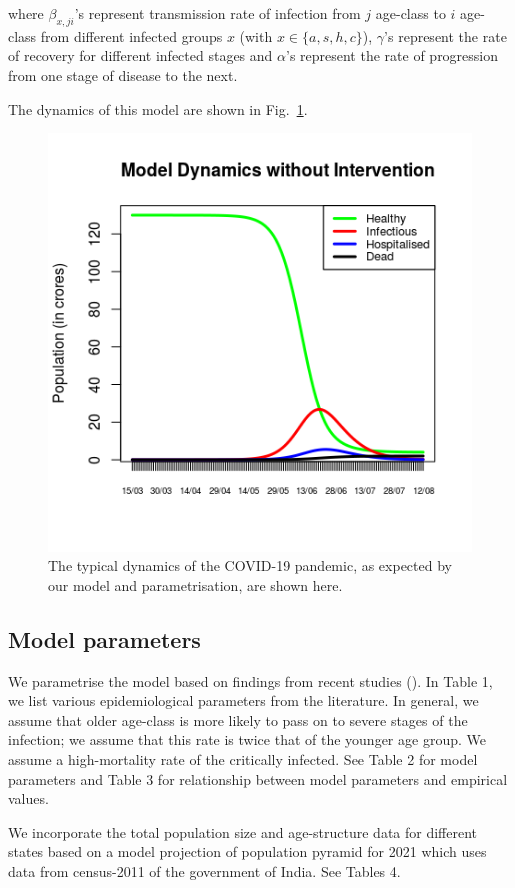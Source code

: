 \documentclass{article}
\begin{document}
\noindent where $\beta_{x,ji}$'s represent transmission rate of infection from $j$ age-class to $i$ age-class from different infected groups $x$ (with $x \in \{a, s, h, c\}$),  $\gamma$'s represent the rate of recovery for different infected stages and $\alpha$'s represent the rate of progression from one stage of disease to the next. 

The dynamics of this model are shown in Fig.\ \ref{fig:modeldynamics}.
\begin{figure}
\centering
\includegraphics[width=.8\linewidth]{modeldynamics.png}
\caption{The typical dynamics of the COVID-19 pandemic, as expected by our model and parametrisation, are shown here.}
\label{fig:modeldynamics}
\end{figure}

\subsection{Model parameters}
We parametrise the model based on findings from recent studies (\cite{wu2020lancet,li2020science,park2020,hill2020}).  In Table 1, we list various epidemiological parameters from the literature. In general, we assume that older age-class is more likely to pass on to severe stages of the infection; we assume that this rate is twice that of the younger age group. We assume a high-mortality rate of the critically infected. See Table 2 for model parameters and Table 3 for relationship between model parameters and empirical values.

We incorporate the total population size and age-structure data for different states based on a model projection of population pyramid for 2021 which uses data from census-2011 of the government of India. See Tables 4. 
\end{document}
